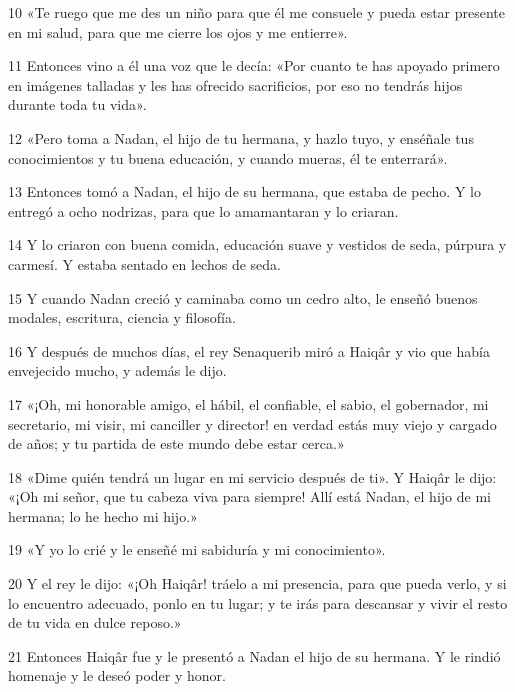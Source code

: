 \par 10 «Te ruego que me des un niño para que él me consuele y pueda estar presente en mi salud, para que me cierre los ojos y me entierre».

\par 11 Entonces vino a él una voz que le decía: «Por cuanto te has apoyado primero en imágenes talladas y les has ofrecido sacrificios, por eso no tendrás hijos durante toda tu vida».

\par 12 «Pero toma a Nadan, el hijo de tu hermana, y hazlo tuyo, y enséñale tus conocimientos y tu buena educación, y cuando mueras, él te enterrará».

\par 13 Entonces tomó a Nadan, el hijo de su hermana, que estaba de pecho. Y lo entregó a ocho nodrizas, para que lo amamantaran y lo criaran.

\par 14 Y lo criaron con buena comida, educación suave y vestidos de seda, púrpura y carmesí. Y estaba sentado en lechos de seda.

\par 15 Y cuando Nadan creció y caminaba como un cedro alto, le enseñó buenos modales, escritura, ciencia y filosofía.

\par 16 Y después de muchos días, el rey Senaquerib miró a Haiqâr y vio que había envejecido mucho, y además le dijo.

\par 17 «¡Oh, mi honorable amigo, el hábil, el confiable, el sabio, el gobernador, mi secretario, mi visir, mi canciller y director! en verdad estás muy viejo y cargado de años; y tu partida de este mundo debe estar cerca.»

\par 18 «Dime quién tendrá un lugar en mi servicio después de ti». Y Haiqâr le dijo: «¡Oh mi señor, que tu cabeza viva para siempre! Allí está Nadan, el hijo de mi hermana; lo he hecho mi hijo.»

\par 19 «Y yo lo crié y le enseñé mi sabiduría y mi conocimiento».

\par 20 Y el rey le dijo: «¡Oh Haiqâr! tráelo a mi presencia, para que pueda verlo, y si lo encuentro adecuado, ponlo en tu lugar; y te irás para descansar y vivir el resto de tu vida en dulce reposo.»

\par 21 Entonces Haiqâr fue y le presentó a Nadan el hijo de su hermana. Y le rindió homenaje y le deseó poder y honor.


